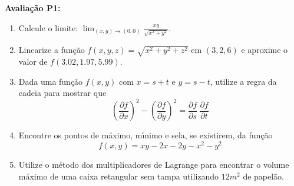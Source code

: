 \documentclass[a4paper,5pt]{amsbook}
\newcommand{\ds}{\displaystyle}
\begin{document}
\vspace{0.2cm}
\textbf{Avalia\c{c}\~ao P1:}
\begin{enumerate}
\item Calcule o limite: $\ds\lim_{(x,y)\rightarrow(0,0)}
	\frac{xy}{\sqrt{x^2+y^2}}$.
\vspace{0.5cm}

\item Linearize a fun\c{c}\~ao $f(x,y,z) = \sqrt{x^2+y^2+z^2}$ em $(3,2,6)$ e
	aproxime o valor de $f(3.02, 1.97, 5.99)$.
\vspace{0.5cm}

\item Dada uma fun\c{c}\~ao $f(x,y)$ com $x = s + t$ e $y = s-t$, utilize a regra da
	cadeia para mostrar que $$\ds{\left(\frac{\partial f}{\partial x}\right)}^2
	- {\left(\frac{\partial f}{\partial y}\right)}^2 = \frac{\partial
		f}{\partial s}\ \frac{\partial f}{\partial t}$$
\vspace{0.5cm}

\item Encontre os pontos de m\'aximo, m\'{\i}nimo e sela, se existirem, da fun\c{c}\~ao
	$$f(x,y) = xy-2x-2y-x^2-y^2$$
\vspace{0.25cm}

\item Utilize o m\'etodo dos multiplicadores de Lagrange para encontrar o volume
	m\'aximo de uma caixa retangular sem tampa utilizando $12m^2$ de papel\~ao.
\vspace{0.5cm}

\end{enumerate}
\end{document}
